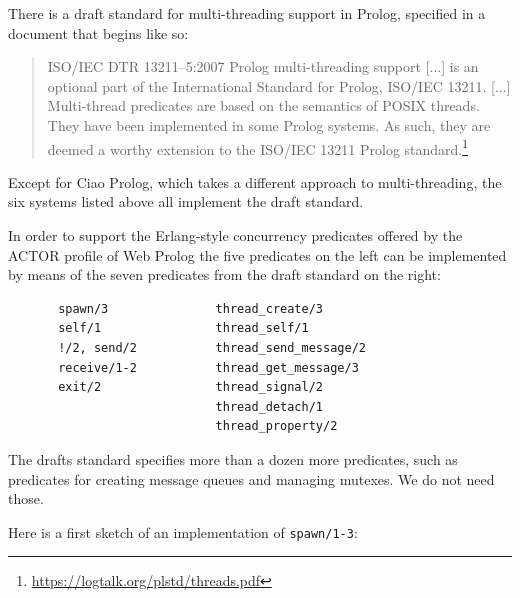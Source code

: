 There is a draft standard for multi-threading support in Prolog, specified in a document that begins like so:

\begin{quotation}
ISO/IEC DTR 13211--5:2007 Prolog multi-threading support [...] is an optional part of the International Standard for Prolog, ISO/IEC 13211. [...] Multi-thread predicates are based on the semantics of POSIX threads. They have been implemented in some Prolog systems. As such, they are deemed a worthy extension to the ISO/IEC 13211 Prolog standard.\footnote{\url{https://logtalk.org/plstd/threads.pdf}}
\end{quotation}

\noindent Except for Ciao Prolog, which takes a different approach to multi-threading, the six systems listed above all implement the draft standard. 

In order to support the Erlang-style concurrency predicates offered by the ACTOR profile of Web Prolog the five predicates on the left can be implemented by means of the seven predicates from the draft standard on the right:

\begin{verbatim}
       spawn/3               thread_create/3
       self/1                thread_self/1
       !/2, send/2           thread_send_message/2
       receive/1-2           thread_get_message/3
       exit/2                thread_signal/2
                             thread_detach/1
                             thread_property/2
\end{verbatim}

\noindent The drafts standard specifies more than a dozen more predicates, such as predicates for creating message queues and managing mutexes. We do not need those.

Here is a first sketch of an implementation of \texttt{spawn/1-3}:


